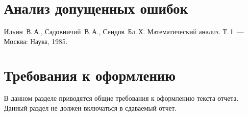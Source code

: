 \documentclass[a4paper,12pt,titlepage,finall]{article}
\begin{document}
\section{Анализ допущенных ошибок}

\newpage
\begin{raggedright}
\begin{thebibliography}{99}
 Ильин~В.\,А., Садовничий~В.\,А., Сендов~Бл.\,Х. Математический анализ. Т.\,1~---
    Москва: Наука, 1985.
\end{thebibliography}
\end{raggedright}

\newpage

\section*{Требования к оформлению}

В данном разделе приводятся общие требования к оформлению текста отчета.
Данный раздел не должен включаться в сдаваемый отчет.
\end{document}
